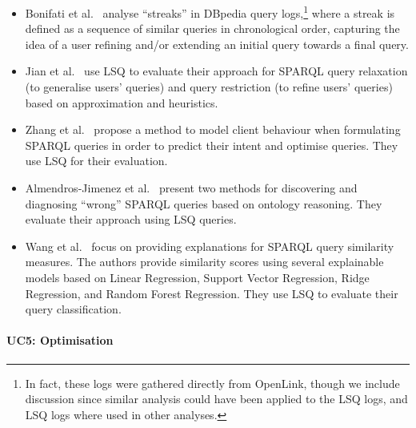 \begin{itemize}
\item Bonifati et al.~\cite{BonifatiMT20} analyse ``streaks'' in DBpedia query logs,\footnote{In fact, these logs were gathered directly from OpenLink, though we include discussion since similar analysis could have been applied to the LSQ logs, and LSQ logs where used in other analyses.} where a streak is defined as a sequence of similar queries in chronological order, capturing the idea of a user refining and/or extending an initial query towards a final query.
\item Jian et al.~\cite{jian2020sparql} use LSQ to evaluate their approach for SPARQL query relaxation (to generalise users' queries) and query restriction (to refine users' queries) based on approximation and heuristics.
\item Zhang et al.~\cite{zhang2020revealing} propose a method to model client behaviour when formulating SPARQL queries in order to predict their intent and optimise queries. They use LSQ for their evaluation.
\item Almendros-Jimenez et al.~\cite{ALMENDROSJIMENEZ2021113772} present two methods for discovering and diagnosing ``wrong'' SPARQL queries based on ontology reasoning. They evaluate their approach using LSQ queries.
\item Wang et al.~\cite{wang2021explaining} focus on providing explanations for SPARQL query similarity measures. The authors provide similarity scores using several explainable models based on Linear Regression, Support Vector Regression, Ridge Regression, and Random Forest Regression. They use LSQ to evaluate their query classification.
\end{itemize}

\paragraph{UC5: Optimisation}
\label{sec-optimisation_uc}


